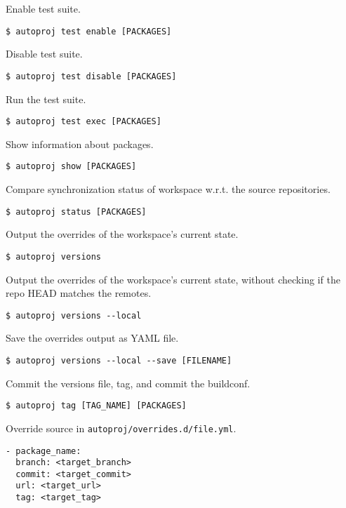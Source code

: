 \documentclass[9pt]{innovativeinnovation-cheatsheet}
\begin{document}
\begin{multicols*}{3}
Enable test suite.
\begin{lstlisting}
$ autoproj test enable [PACKAGES]
\end{lstlisting}

Disable test suite.
\begin{lstlisting}
$ autoproj test disable [PACKAGES]
\end{lstlisting}

Run the test suite.
\begin{lstlisting}
$ autoproj test exec [PACKAGES]
\end{lstlisting}


Show information about packages. 
\begin{lstlisting}
$ autoproj show [PACKAGES]
\end{lstlisting}

Compare synchronization status of workspace w.r.t. the source repositories.
\begin{lstlisting}
$ autoproj status [PACKAGES]
\end{lstlisting}


Output the overrides of the workspace's current state.
\begin{lstlisting}
$ autoproj versions
\end{lstlisting}

Output the overrides of the workspace's current state, without checking if the repo HEAD matches the remotes.
\begin{lstlisting}
$ autoproj versions --local
\end{lstlisting}

Save the overrides output as YAML file.
\begin{lstlisting}
$ autoproj versions --local --save [FILENAME]
\end{lstlisting}

Commit the versions file, tag, and commit the buildconf.
\begin{lstlisting}
$ autoproj tag [TAG_NAME] [PACKAGES]
\end{lstlisting}


Override source in \verb|autoproj/overrides.d/file.yml|.
\begin{lstlisting}
- package_name:
  branch: <target_branch>
  commit: <target_commit>
  url: <target_url>
  tag: <target_tag>
\end{lstlisting}


\end{multicols*}
\end{document}
